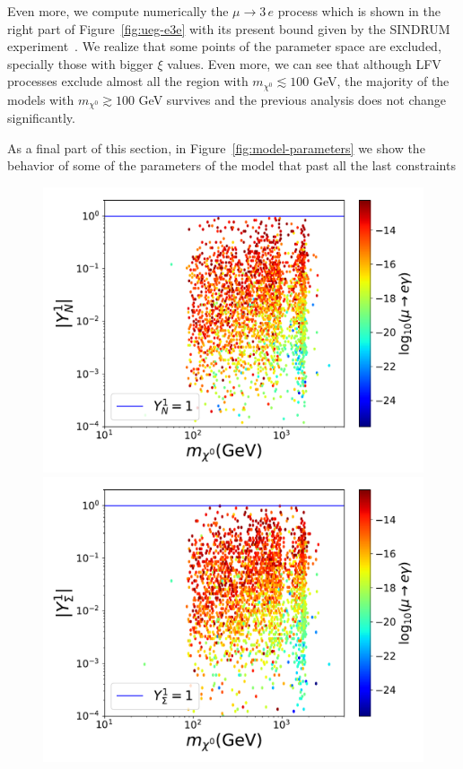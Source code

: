 \documentclass[12pt,letterpaper]{article}
\begin{document}
Even more, we compute numerically the $\mu\rightarrow 3\,e$ process which is shown in the right part of Figure~\ref{fig:ueg-e3e} with its present bound given by the SINDRUM experiment~\cite{Bertl:1985mw}.
We realize that some points of the parameter space are excluded, specially those with bigger $\xi$ values. Even more, we can see that although LFV processes exclude almost all the region with $m_{\chi^0}\lesssim 100$ GeV, the majority of the models with $m_{\chi^0} \gtrsim 100$ GeV survives and the previous analysis does not change significantly. 

As a final part of this section, in Figure~\ref{fig:model-parameters} we show the behavior of some of the parameters of the model that past all the last constraints
%
\begin{figure}
\begin{center}
\includegraphics[scale=0.4]{YN1}
\includegraphics[scale=0.4]{YTF1}

\end{center}
\end{figure}
\end{document}
